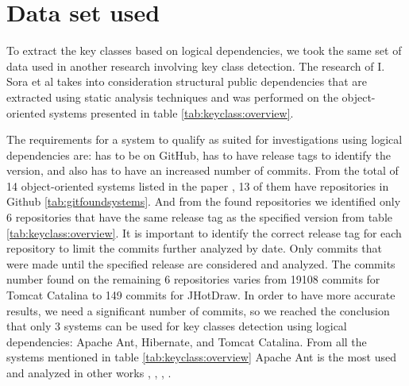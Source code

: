 \documentclass[12pt]{mitthesis}
\begin{document}
\section{Data set used}
To extract the key classes based on logical dependencies, we took the same set of data used in another research involving key class detection. The research of I. Sora et al \cite{Finding-key-classes} takes into consideration structural public dependencies that are extracted using static analysis techniques and was performed on the object-oriented systems presented in table \ref{tab:keyclass:overview}.

The requirements for a system to qualify as suited for investigations using logical dependencies are: has to be on GitHub, has to have release tags to identify the version, and also has to have an increased number of commits. 
From the total of 14 object-oriented systems listed in the paper \cite{Finding-key-classes}, 13 of them have repositories in Github \ref{tab:gitfoundsystems}. And from the found repositories we identified only 6 repositories that have the same release tag as the specified version from table \ref{tab:keyclass:overview}. It is important to identify the correct release tag for each repository to limit the commits further analyzed by date. Only commits that were made until the specified release are considered and analyzed.
The commits number found on the remaining 6 repositories varies from 19108 commits for Tomcat Catalina to 149 commits for JHotDraw. In order to have more accurate results, we need a significant number of commits, so we reached the conclusion that only 3 systems can be used for key classes detection using logical dependencies: Apache Ant, Hibernate, and Tomcat Catalina.  From all the systems mentioned in table \ref{tab:keyclass:overview} Apache Ant is the most used and analyzed in other  works \cite{enase19}, \cite{7332515}, \cite{1402122}, \cite{Kamran2016IdentificationOC}.
\end{document}
